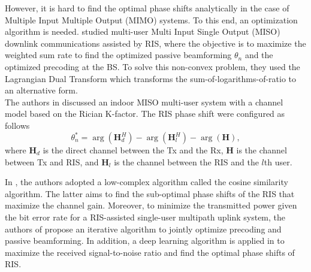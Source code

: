 \documentclass[conference]{IEEEtran}
\begin{document}
However, it is hard to find the optimal phase shifts analytically in the case of Multiple Input Multiple Output (MIMO) systems. To this end, an optimization algorithm is needed. \cite{8982186} studied multi-user Multi Input Single Output (MISO) downlink communications assisted by RIS, where the objective is to maximize the weighted sum rate to find  the optimized passive beamforming $\theta_n$ and the optimized precoding at the BS.
To solve this non-convex problem, they used the  Lagrangian Dual Transform which transforms the sum-of-logarithms-of-ratio to an alternative form. \\
The authors in \cite{9606297} discussed an indoor MISO multi-user system with a channel model based on the Rician K-factor. The RIS phase shift were configured as follows 
\begin{equation}
   \theta_n^*=\arg(\textbf{H}_d^H) - \arg(\textbf{H}_l^H)-\arg(\textbf{H}),
\end{equation}
where $\textbf{H}_d$ is the direct channel between the Tx and the Rx, $\textbf{H}$ is the channel  between Tx and RIS, and $\textbf{H}_l$ is the channel between the RIS and the $l$th user. 

In \cite{9160972}, the authors adopted a low-complex algorithm called  the cosine similarity algorithm. The latter  aims to find the sub-optimal phase shifts of the RIS that maximize the channel gain.  Moreover, to minimize the transmitted power given the bit error rate for a RIS-assisted single-user multipath uplink system,
the authors of \cite{9495932} propose an iterative algorithm to jointly optimize precoding and passive beamforming. In addition, a deep learning algorithm is  applied in \cite{khan2019deep} to maximize the received signal-to-noise ratio and  find the optimal phase shifts of RIS. %
\end{document}
